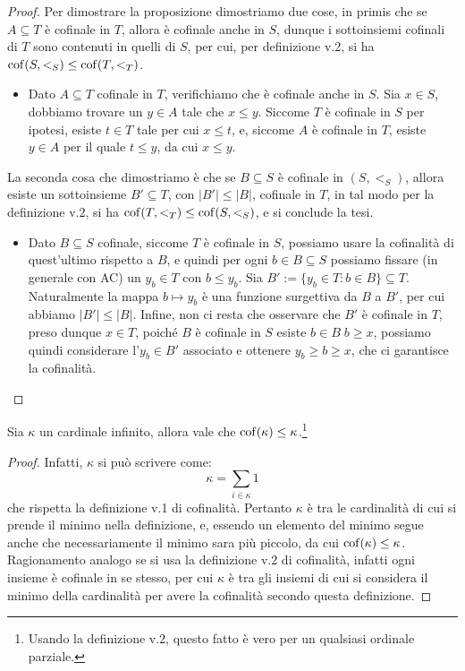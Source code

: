 \begin{proof}
	Per dimostrare la proposizione dimostriamo due cose, in primis che se $A \subseteq T$ \`e cofinale in $T$, allora \`e cofinale anche in $S$, dunque i sottoinsiemi cofinali di $T$ sono contenuti in quelli di $S$, per cui, per definizione v.2, si ha $\operatorname{cof}(S,<_S) \leq \operatorname{cof}(T,<_T)$.
	\begin{itemize}
		\item Dato $A \subseteq T$ cofinale in $T$, verifichiamo che \`e cofinale anche in $S$. Sia $x \in S$, dobbiamo trovare un $y \in A$ tale che $x \leq y$. Siccome $T$ \`e cofinale in $S$ per ipotesi, esiste $t \in T$ tale per cui $x \leq t$, e, siccome 
		$A$ \`e cofinale in $T$, esiste $y \in A$ per il quale $t \leq y$, da cui $x \leq y$.
	\end{itemize}
	La seconda cosa che dimostriamo \`e che se $B \subseteq S$ \`e cofinale in $(S,<_S)$, allora esiste un sottoinsieme $B' \subseteq T$, con $|B'| \leq |B|$, cofinale in $T$, in tal modo per la definizione v.2, si ha $\operatorname{cof}(T,<_T) \leq \operatorname{cof}(S,<_S)$, e si conclude la tesi.
	\begin{itemize}
		\item Dato $B \subseteq S$ cofinale, siccome $T$ \`e cofinale in $S$, possiamo usare la cofinalit\`a di quest'ultimo rispetto a $B$, e quindi per ogni $b \in B \subseteq S$ possiamo fissare (in generale con AC) un $y_b \in T$ con $b \leq y_b$. Sia $B' := \{y_b \in T : b \in B\} \subseteq T$.\\
		Naturalmente la mappa $b \mapsto y_b$ \`e una funzione surgettiva da $B$ a $B'$, per cui abbiamo $|B'| \leq |B|$. Infine, non ci resta che osservare che $B'$ \`e cofinale in $T$, preso dunque $x \in T$, poich\'e $B$ \`e cofinale in $S$ esiste $b \in B \; b \geq x$,
		possiamo quindi considerare l'$y_b \in B'$ associato e ottenere $y_b \geq b \geq x$, che ci garantisce la cofinalit\`a.
	\end{itemize}
\end{proof}

\begin{proposition}
	Sia $\kappa$ un cardinale infinito, allora vale che $\operatorname{cof}(\kappa) \leq \kappa$.\footnote{Usando la definizione v.2, questo fatto \`e vero per un qualsiasi ordinale parziale.}
\end{proposition}

\begin{proof}
	Infatti, $\kappa$ si pu\`o scrivere come:
	\[ \kappa = \sum_{i \in \kappa} 1
		\]
	che rispetta la definizione v.1 di cofinalit\`a. Pertanto $\kappa$ \`e tra le cardinalit\`a di cui si prende il minimo nella definizione, e, essendo un elemento
	del minimo segue anche che necessariamente il minimo sara pi\`u piccolo, da cui $\operatorname{cof}(\kappa) \leq \kappa$.\\
	Ragionamento analogo se si usa la definizione v.2 di cofinalit\`a, infatti ogni insieme \`e cofinale in se stesso, per cui $\kappa$ \`e tra gli insiemi di cui si considera il minimo della cardinalit\`a per avere la cofinalit\`a secondo questa definizione.
\end{proof}

